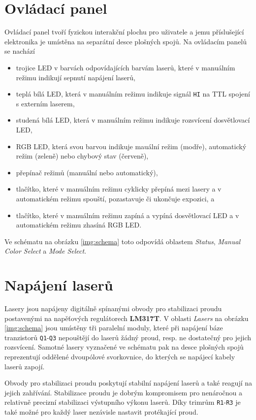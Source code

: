 \documentclass[twoside,project]{../MFFPrace}
\begin{document}
\section{Ovládací panel}
Ovládací panel tvoří fyzickou interakční plochu pro uživatele a jemu příslušející elektronika je umístěna na separátní desce plošných spojů. Na ovládacím panelů se nachází
\begin{itemize}
    \item trojice LED v barvách odpovídajících barvám laserů, které v manuálním režimu indikují sepnutí napájení laserů,
    \item teplá bílá LED, která v manuálním režimu indikuje signál \texttt{HI} na TTL spojení s externím laserem,
    \item studená bílá LED, která v manuálním režimu indikuje rozsvícení dosvětlovací LED,
    \item RGB LED, která svou barvou indikuje mauální režim (modře), automatický režim (zeleně) nebo chybový stav (červeně),
    \item přepínač režimů (manuální nebo automatický),
    \item tlačítko, které v manuálním režimu cyklicky přepíná mezi lasery a v automatickém režimu spouští, pozastavuje či ukončuje expozici, a
    \item tlačítko, které v manuálním režimu zapíná a vypíná dosvětlovací LED a v automatickém režimu zhasíná RGB LED.
\end{itemize}
Ve schématu na obrázku \ref{img:schema} toto odpovídá oblastem \textit{Status}, \textit{Manual Color Select} a \textit{Mode Select}.

\section{Napájení laserů}
Lasery jsou napájeny digitálně spínanými obvody pro stabilizaci proudu postavenými na napěťových regulátorech \textbf{LM317T}. V oblasti \textit{Lasers} na obrázku \ref{img:schema} jsou umístěny tři paralelní moduly, které při napájení báze tranzistorů \texttt{Q1}-\texttt{Q3} nepouštějí do laserů žádný proud, resp. ne dostatečný pro jejich rozsvícení. Samotné lasery vyznačené ve schématu pak na desce plošných spojů reprezentují oddělené dvoupólové svorkovnice, do kterých se napájecí kabely laserů zapojí.

Obvody pro stabilizaci proudu poskytují stabilní napájení laserů a také reagují na jejich zahřívání. Stabilizace proudu je dobrým kompromisem pro nenáročnou a relativně precizní stabilizaci výstupního výkonu laserů. Díky trimrům \texttt{R1}-\texttt{R3} je také možné pro každý laser nezávisle nastavit protékající proud.
\end{document}
